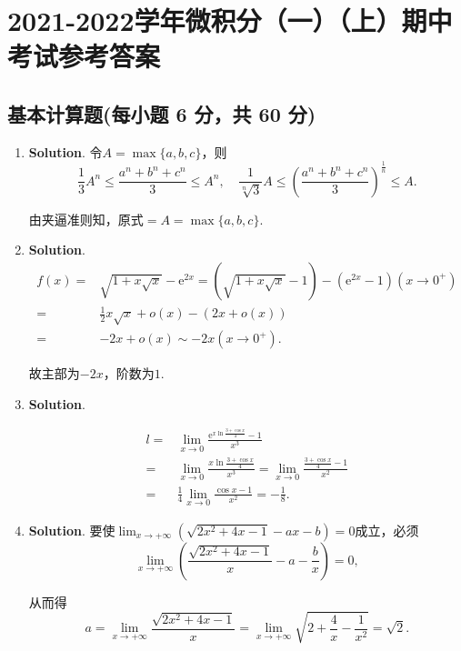 \documentclass[../Main.tex]{subfiles}
\begin{document}
  \chapter{2021-2022学年微积分（一）（上）期中考试参考答案}
  \section{基本计算题(每小题 6 分，共 60 分)}
  \begin{enumerate}
    \item \textbf{Solution}. 令$A=\max\{a,b,c\}$，则
      \[
        \frac{1}{3}A^{n}\leq\frac{a^{n}+b^{n}+c^{n}}{3}\leq A^{n},\quad \frac{1}{\sqrt[n]{3}}
        A\leq\left(\frac{a^{n}+b^{n}+c^{n}}{3}\right)^{\frac{1}{n}}\leq A.
      \]

      由夹逼准则知，原式$=A=\max\{a,b,c\}$.

    \item \textbf{Solution}.
      \[
        \begin{aligned}
          f(x)= & \sqrt{1+x\sqrt{x}}-\mathrm{e}^{2x}=\left(\sqrt{1+x\sqrt{x}}-1\right)-\left(\mathrm{e}^{2x}-1\right)(x\to 0^{+}) \\
          =     & \frac{1}{2}x\sqrt{x}+o(x)-(2x+o(x))                                                                             \\
          =     & -2x+o(x)\sim -2x(x\to0^{+}).
        \end{aligned}
      \]

      故主部为$-2x$，阶数为$1$.

    \item \textbf{Solution}.

      \[
        \begin{aligned}
          l= & \lim_{x\to0}\frac{\mathrm{e}^{x\ln\frac{3+\cos x}{4}}-1}{x^3}                               \\
          =  & \lim_{x\to0}\frac{x\ln\frac{3+\cos x}{4}}{x^3}=\lim_{x\to0}\frac{\frac{3+\cos x}{4}-1}{x^2} \\
          =  & \frac{1}{4}\lim_{x\to0}\frac{\cos x-1}{x^2}=-\frac{1}{8}.
        \end{aligned}
      \]

    \item \textbf{Solution}. 要使$\lim_{x\to+\infty}\left(\sqrt{2x^{2}+4x-1}-ax-b
      \right)=0$成立，必须
      \[
        \lim_{x\to+\infty}\left(\frac{\sqrt{2x^{2}+4x-1}}{x}-a-\frac{b}{x}\right)
        =0,
      \]

      从而得
      \[
        a=\lim_{x\to+\infty}\frac{\sqrt{2x^{2}+4x-1}}{x}=\lim_{x\to+\infty}\sqrt{2+\frac{4}{x}-\frac{1}{x^{2}}}
        =\sqrt{2}.
      \]


\end{enumerate}
\end{document}
